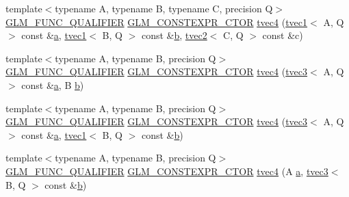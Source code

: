 \begin{DoxyCompactItemize}
\item 
{\footnotesize template$<$typename A, typename B, typename C, precision Q$>$ }\\\mbox{\hyperlink{setup_8hpp_a33fdea6f91c5f834105f7415e2a64407}{G\+L\+M\+\_\+\+F\+U\+N\+C\+\_\+\+Q\+U\+A\+L\+I\+F\+I\+ER}} \mbox{\hyperlink{setup_8hpp_ad34178a09666081abdb573c14d1f4a5a}{G\+L\+M\+\_\+\+C\+O\+N\+S\+T\+E\+X\+P\+R\+\_\+\+C\+T\+OR}} \mbox{\hyperlink{structglm_1_1tvec4_a934d3eae7a5d0a856dfa489a05ed0add}{tvec4}} (\mbox{\hyperlink{structglm_1_1tvec1}{tvec1}}$<$ A, Q $>$ const \&\mbox{\hyperlink{glad_8h_ac8729153468b5dcf13f971b21d84d4e5}{a}}, \mbox{\hyperlink{structglm_1_1tvec1}{tvec1}}$<$ B, Q $>$ const \&\mbox{\hyperlink{glad_8h_a6eba317e3cf44d6d26c04a5a8f197dcb}{b}}, \mbox{\hyperlink{structglm_1_1tvec2}{tvec2}}$<$ C, Q $>$ const \&c)
\item 
{\footnotesize template$<$typename A, typename B, precision Q$>$ }\\\mbox{\hyperlink{setup_8hpp_a33fdea6f91c5f834105f7415e2a64407}{G\+L\+M\+\_\+\+F\+U\+N\+C\+\_\+\+Q\+U\+A\+L\+I\+F\+I\+ER}} \mbox{\hyperlink{setup_8hpp_ad34178a09666081abdb573c14d1f4a5a}{G\+L\+M\+\_\+\+C\+O\+N\+S\+T\+E\+X\+P\+R\+\_\+\+C\+T\+OR}} \mbox{\hyperlink{structglm_1_1tvec4_a001bfb02e9fa17b80e0623427fa0930a}{tvec4}} (\mbox{\hyperlink{structglm_1_1tvec3}{tvec3}}$<$ A, Q $>$ const \&\mbox{\hyperlink{glad_8h_ac8729153468b5dcf13f971b21d84d4e5}{a}}, B \mbox{\hyperlink{glad_8h_a6eba317e3cf44d6d26c04a5a8f197dcb}{b}})
\item 
{\footnotesize template$<$typename A, typename B, precision Q$>$ }\\\mbox{\hyperlink{setup_8hpp_a33fdea6f91c5f834105f7415e2a64407}{G\+L\+M\+\_\+\+F\+U\+N\+C\+\_\+\+Q\+U\+A\+L\+I\+F\+I\+ER}} \mbox{\hyperlink{setup_8hpp_ad34178a09666081abdb573c14d1f4a5a}{G\+L\+M\+\_\+\+C\+O\+N\+S\+T\+E\+X\+P\+R\+\_\+\+C\+T\+OR}} \mbox{\hyperlink{structglm_1_1tvec4_a506f198067118e4a9f162df80f60f3f5}{tvec4}} (\mbox{\hyperlink{structglm_1_1tvec3}{tvec3}}$<$ A, Q $>$ const \&\mbox{\hyperlink{glad_8h_ac8729153468b5dcf13f971b21d84d4e5}{a}}, \mbox{\hyperlink{structglm_1_1tvec1}{tvec1}}$<$ B, Q $>$ const \&\mbox{\hyperlink{glad_8h_a6eba317e3cf44d6d26c04a5a8f197dcb}{b}})
\item 
{\footnotesize template$<$typename A, typename B, precision Q$>$ }\\\mbox{\hyperlink{setup_8hpp_a33fdea6f91c5f834105f7415e2a64407}{G\+L\+M\+\_\+\+F\+U\+N\+C\+\_\+\+Q\+U\+A\+L\+I\+F\+I\+ER}} \mbox{\hyperlink{setup_8hpp_ad34178a09666081abdb573c14d1f4a5a}{G\+L\+M\+\_\+\+C\+O\+N\+S\+T\+E\+X\+P\+R\+\_\+\+C\+T\+OR}} \mbox{\hyperlink{structglm_1_1tvec4_a2f15e73af5478c2f022181af8ad77a0a}{tvec4}} (A \mbox{\hyperlink{glad_8h_ac8729153468b5dcf13f971b21d84d4e5}{a}}, \mbox{\hyperlink{structglm_1_1tvec3}{tvec3}}$<$ B, Q $>$ const \&\mbox{\hyperlink{glad_8h_a6eba317e3cf44d6d26c04a5a8f197dcb}{b}})

\end{DoxyCompactItemize}
